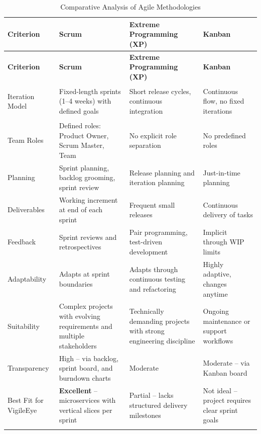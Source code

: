 \documentclass[12pt,a4paper,oneside]{report}
\newlength{\TblCompKeyW}
\newlength{\TblCompColW}
\begin{document}
\begin{longtable}{|>{\bfseries\small\raggedright\arraybackslash}p{\TblCompKeyW}|>{\raggedright\arraybackslash}p{\TblCompColW}|>{\raggedright\arraybackslash}p{\TblCompColW}|>{\raggedright\arraybackslash}p{\TblCompColW}|}
\hline
\rowcolor{gray!20}
\textbf{Criterion} & \textbf{Scrum} & \textbf{Extreme Programming (XP)} & \textbf{Kanban} \\
\hline
\endfirsthead
\hline
\rowcolor{gray!20}
\textbf{Criterion} & \textbf{Scrum} & \textbf{Extreme Programming (XP)} & \textbf{Kanban} \\
\hline
\endhead
\hline
\endfoot
Iteration Model & Fixed-length sprints (1--4 weeks) with defined goals & Short release cycles, continuous integration & Continuous flow, no fixed iterations \\
\hline
Team Roles & Defined roles: Product Owner, Scrum Master, Team & No explicit role separation & No predefined roles \\
\hline
Planning & Sprint planning, backlog grooming, sprint review & Release planning and iteration planning & Just-in-time planning \\
\hline
Deliverables & Working increment at end of each sprint & Frequent small releases & Continuous delivery of tasks \\
\hline
Feedback & Sprint reviews and retrospectives & Pair programming, test-driven development & Implicit through WIP limits \\
\hline
Adaptability & Adapts at sprint boundaries & Adapts through continuous testing and refactoring & Highly adaptive, changes anytime \\
\hline
Suitability & Complex projects with evolving requirements and multiple stakeholders & Technically demanding projects with strong engineering discipline & Ongoing maintenance or support workflows \\
\hline
Transparency & High -- via backlog, sprint board, and burndown charts & Moderate & Moderate -- via Kanban board \\
\hline
Best Fit for VigileEye & \textbf{Excellent} -- microservices with vertical slices per sprint & Partial -- lacks structured delivery milestones & Not ideal -- project requires clear sprint goals \\
\hline
\caption{Comparative Analysis of Agile Methodologies}
\label{tab:methodology_comparison}
\end{longtable}

\end{document}

